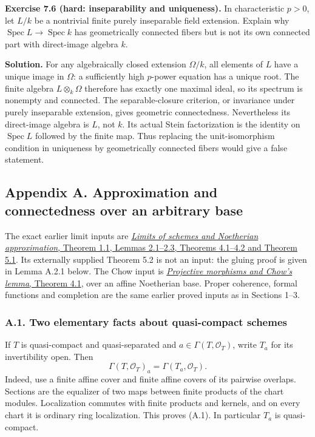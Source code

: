 \documentclass[11pt]{article}
\begin{document}
\textbf{Exercise 7.6 (hard: inseparability and uniqueness).} In
characteristic \(p>0\), let \(L/k\) be a nontrivial finite purely
inseparable field extension. Explain why
\(\operatorname{Spec}L\to\operatorname{Spec}k\) has geometrically
connected fibers but is not its own connected part with direct-image
algebra \(k\).

\textbf{Solution.} For any algebraically closed extension \(\Omega/k\),
all elements of \(L\) have a unique image in \(\Omega\): a sufficiently
high \(p\)-power equation has a unique root. The finite algebra
\(L\otimes_k\Omega\) therefore has exactly one maximal ideal, so its
spectrum is nonempty and connected. The separable-closure criterion, or
invariance under purely inseparable extension, gives geometric
connectedness. Nevertheless its direct-image algebra is \(L\), not
\(k\). Its actual Stein factorization is the identity on
\(\operatorname{Spec}L\) followed by the finite map. Thus replacing the
unit-isomorphism condition in uniqueness by geometrically connected
fibers would give a false statement.

\subsection{Appendix A. Approximation and connectedness over an
arbitrary
base}\label{appendix-a.-approximation-and-connectedness-over-an-arbitrary-base}

The exact earlier limit inputs are
\href{../AG-GS/prerequisites/AG-MO/limits-and-noetherian-approximation.html}{\emph{Limits
of schemes and Noetherian approximation}, Theorem 1.1, Lemmas 2.1--2.3,
Theorems 4.1--4.2 and Theorem 5.1}. Its externally supplied Theorem 5.2
is not an input: the gluing proof is given in Lemma A.2.1 below. The
Chow input is
\href{../AG-GS/prerequisites/AG-MO/projective-morphisms-and-chows-lemma.html}{\emph{Projective
morphisms and Chow's lemma}, Theorem 4.1}, over an affine Noetherian
base. Proper coherence, formal functions and completion are the same
earlier proved inputs as in Sections 1--3.

\subsubsection{A.1. Two elementary facts about quasi-compact
schemes}\label{a.1.-two-elementary-facts-about-quasi-compact-schemes}

If \(T\) is quasi-compact and quasi-separated and
\(a\in\Gamma(T,\mathcal O_T)\), write \(T_a\) for its invertibility
open. Then \[
\Gamma(T,\mathcal O_T)_a=\Gamma(T_a,\mathcal O_T).
\tag{A.1}
\] Indeed, use a finite affine cover and finite affine covers of its
pairwise overlaps. Sections are the equalizer of two maps between finite
products of the chart modules. Localization commutes with finite
products and kernels, and on every chart it is ordinary ring
localization. This proves (A.1). In particular \(T_a\) is quasi-compact.
\end{document}
